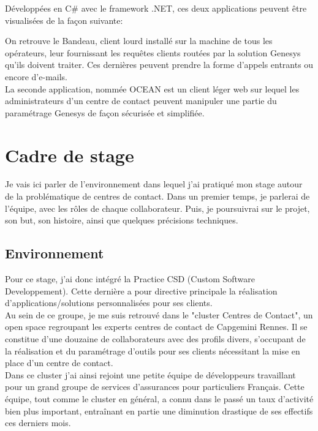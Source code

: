 \documentclass{rapport}
\begin{document}
Développées en C\# avec le framework .NET, ces deux applications peuvent être visualisées de la façon suivante:


On retrouve le Bandeau, client lourd installé sur la machine de tous les opérateurs, leur fournissant les requêtes clients routées par la solution Genesys qu'ils doivent traiter. Ces dernières peuvent prendre la forme d'appels entrants ou encore d'e-mails.\\

La seconde application, nommée OCEAN est un client léger web sur lequel les administrateurs d'un centre de contact peuvent manipuler une partie du paramétrage Genesys de façon sécurisée et simplifiée.

\newpage

\section{Cadre de stage}

Je vais ici parler de l'environnement dans lequel j'ai pratiqué mon stage autour de la problématique de centres de contact.
Dans un premier temps, je parlerai de l'équipe, avec les rôles de chaque collaborateur. Puis, je poursuivrai sur le projet, son but, son histoire, ainsi que quelques précisions techniques.

\subsection{Environnement}

Pour ce stage, j'ai donc intégré la Practice CSD (Custom Software Developpement). Cette dernière a pour directive principale la réalisation d'applications/solutions personnalisées pour ses clients.\\

Au sein de ce groupe, je me suis retrouvé dans le "cluster Centres de Contact", un open space regroupant les experts centres de contact de Capgemini Rennes. Il se constitue d'une douzaine de collaborateurs avec des profils divers, s'occupant de la réalisation et du paramétrage d'outils pour ses clients nécessitant la mise en place d'un centre de contact.\\

Dans ce cluster j'ai ainsi rejoint une petite équipe de développeurs travaillant pour un grand groupe de services d’assurances pour particuliers Français. Cette équipe, tout comme le cluster en général, a connu dans le passé un taux d'activité bien plus important, entraînant en partie une diminution drastique de ses effectifs ces derniers mois.
\end{document}
